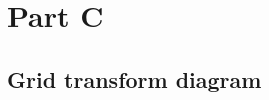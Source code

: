 \documentclass{article}
\numberwithin{equation}{section}
\theoremstyle{definition}
\begin{document}

        
        



        



\section{Part C}
\subsection{Grid transform diagram}
\end{document}
